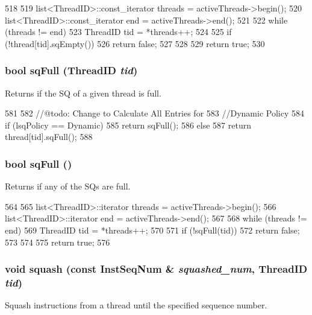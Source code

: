 \begin{DoxyCode}
518 {
519     list<ThreadID>::const_iterator threads = activeThreads->begin();
520     list<ThreadID>::const_iterator end = activeThreads->end();
521 
522     while (threads != end) {
523         ThreadID tid = *threads++;
524 
525         if (!thread[tid].sqEmpty())
526             return false;
527     }
528 
529     return true;
530 }
\end{DoxyCode}
\hypertarget{classLSQ_a6a3501ebb06c38938a3b0ebcea2b6a8b}{
\subsubsection[{sqFull}]{\setlength{\rightskip}{0pt plus 5cm}bool sqFull ({\bf ThreadID} {\em tid})}}
\label{classLSQ_a6a3501ebb06c38938a3b0ebcea2b6a8b}
Returns if the SQ of a given thread is full. 


\begin{DoxyCode}
581 {
582      //@todo: Change to Calculate All Entries for
583     //Dynamic Policy
584     if (lsqPolicy == Dynamic)
585         return sqFull();
586     else
587         return thread[tid].sqFull();
588 }
\end{DoxyCode}
\hypertarget{classLSQ_a477981d1f905d2d398a1527f7149e3c4}{
\subsubsection[{sqFull}]{\setlength{\rightskip}{0pt plus 5cm}bool sqFull ()}}
\label{classLSQ_a477981d1f905d2d398a1527f7149e3c4}
Returns if any of the SQs are full. 


\begin{DoxyCode}
564 {
565     list<ThreadID>::iterator threads = activeThreads->begin();
566     list<ThreadID>::iterator end = activeThreads->end();
567 
568     while (threads != end) {
569         ThreadID tid = *threads++;
570 
571         if (!sqFull(tid))
572             return false;
573     }
574 
575     return true;
576 }
\end{DoxyCode}
\hypertarget{classLSQ_a74283dfde2ab06c84e10bd85000c168b}{
\subsubsection[{squash}]{\setlength{\rightskip}{0pt plus 5cm}void squash (const {\bf InstSeqNum} \& {\em squashed\_\-num}, \/  {\bf ThreadID} {\em tid})}}
\label{classLSQ_a74283dfde2ab06c84e10bd85000c168b}
Squash instructions from a thread until the specified sequence number. 


